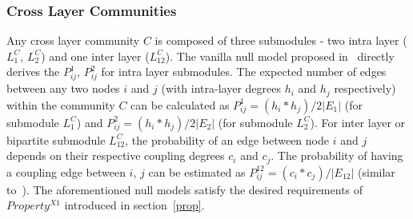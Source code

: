 \subsubsection{Cross Layer Communities}
Any cross layer community $C$ is composed of three submodules - two intra layer ($L^C_1$, $L^C_2$) and one inter layer ($L^C_{12}$).
The vanilla null model proposed in~\cite{newman2006modularity} directly derives the $P^1_{ij}$, $P^2_{ij}$ for intra layer submodules.
The expected number of edges between any two nodes $i$ and $j$ (with intra-layer degrees
$h_i$ and $h_j$ respectively) within the community $C$ can be calculated as
$P^1_{ij}=(h_i*h_j)/2\left \vert E_1 \right \vert$ (for submodule $L^C_1$) and $P^2_{ij}=(h_i*h_j)/2\left \vert E_2 \right \vert$
(for submodule $L^C_2$).
For inter layer or bipartite submodule $L^C_{12}$, the probability of an edge between node $i$ and $j$ depends on their respective
coupling degrees $c_i$ and $c_j$.
The probability of having a coupling edge between $i$, $j$ can be estimated as $P^{12}_{ij}=(c_i*c_j)/\left \vert E_{12} \right
\vert$ (similar
to~\cite{barber2007modularity}). The aforementioned null models satisfy the desired requirements of $Property^{X1}$ introduced
in section~\ref{prop}.

